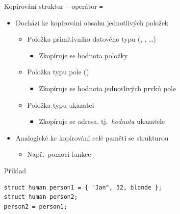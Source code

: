 \begin{frame}[fragile]{Kopírování struktur -- operátor \texttt{=}}

  \begin{itemize}
    \item Dochází ke kopírování obsahu jednotlivých položek
    \begin{itemize}
      \item Položka primitivního datového typu (, , \dots)
      \begin{itemize}
	\item Zkopíruje se hodnota položky
      \end{itemize}

      \pause

      \item Položka typu pole ()
      \begin{itemize}
	\item Zkopíruje se hodnota jednotlivých prvků pole
      \end{itemize}

      \pause

      \item Položka typu ukazatel
      \begin{itemize}
	\item Zkopíruje se adresa, tj.\ \emph{hodnota} ukazatele
      \end{itemize}
    \end{itemize}

    \pause

    \item Analogické ke kopírování celé paměti se strukturou
    \begin{itemize}
      \item Např.\ pomocí funkce 
    \end{itemize}

  \end{itemize}


\begin{block}{Příklad}
\begin{lstlisting}
struct human person1 = { "Jan", 32, blonde };
struct human person2;
person2 = person1;
\end{lstlisting}
\end{block}

\end{frame}

